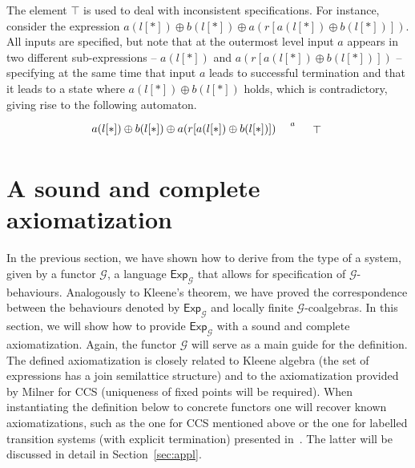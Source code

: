 \documentclass{LMCS}
\newcommand\Exp{\mathsf{Exp}}
\newcommand\G{\mathcal{G}}
\theoremstyle{definition}
\theoremstyle{plain}
\theoremstyle{plain}
\theoremstyle{plain}
\theoremstyle{plain}
\theoremstyle{definition}
\theoremstyle{definition}
\begin{document}
The element $\top$ is used to deal with inconsistent
specifications. For instance, consider the expression $a(l[*])
\oplus b(l[*]) \oplus a(r[a(l[*]) \oplus b(l[*])])$. All inputs
are specified, but note that at the outermost level input $a$
appears in two different sub-expressions -- $a(l[*])$ and
$a(r[a(l[*]) \oplus b(l[*])])$ -- specifying at the same time that
input $a$ leads to successful termination and that it leads to a
state where $a(l[*]) \oplus b (l[*])$ holds, which is
contradictory, giving rise to the following automaton.
\[
\xymatrix{*+[F-:<3pt>]{a(l[*]) \oplus b(l[*]) \oplus a(r[a(l[*])
\oplus b(l[*])])
} \ar@{~>}[r]^-{a}& *++[F]{\top}}
\]


\section{A sound and complete axiomatization}\label{sec:axiom}

In the previous section, we have shown how to derive from the type of
a system, given by a functor $\G$, a language $\Exp_\G$ that allows for
specification of $\G$-behaviours. Analogously to Kleene's theorem, we
have proved the correspondence between the behaviours denoted by $\Exp_\G$
and locally finite $\G$-coalgebras. In this section, we will show how
to provide $\Exp_\G$ with a sound and complete axiomatization. Again,
the functor $\G$ will serve as a main guide for the definition. The
defined axiomatization is closely related to Kleene algebra (the set
of expressions has a join semilattice structure) and to the
axiomatization provided by Milner for CCS (uniqueness of fixed points
will be required). When instantiating the definition below to concrete
functors one will recover known axiomatizations, such as the one for
CCS mentioned above or the one for labelled transition systems (with
explicit termination) presented in~\cite{AcetoH92}. The latter will be
discussed in detail in Section~\ref{sec:appl}. 
\end{document}
